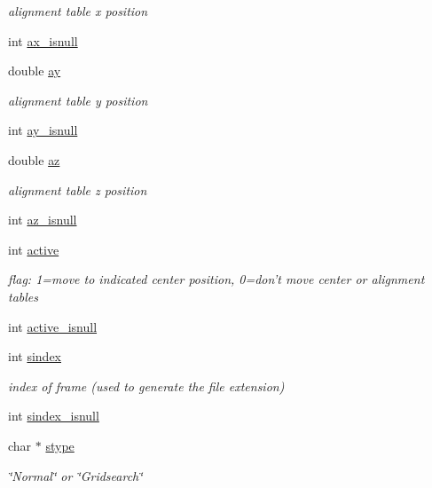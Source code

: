 \begin{DoxyCompactItemize}
\begin{DoxyCompactList}\small\item\em alignment table x position \end{DoxyCompactList}\item 
int \hyperlink{structlspg__nextshot__struct_aae46c7911b2b218497ad4a68f3dbb7d9}{ax\-\_\-isnull}
\item 
double \hyperlink{structlspg__nextshot__struct_a9e20b9a0aeb41f7f7d653a1c60335bf1}{ay}
\begin{DoxyCompactList}\small\item\em alignment table y position \end{DoxyCompactList}\item 
int \hyperlink{structlspg__nextshot__struct_a9da91abc8090532ed98ccd47a3bab775}{ay\-\_\-isnull}
\item 
double \hyperlink{structlspg__nextshot__struct_a66e678866ce79f6398b66d033ae45a17}{az}
\begin{DoxyCompactList}\small\item\em alignment table z position \end{DoxyCompactList}\item 
int \hyperlink{structlspg__nextshot__struct_aaebd6d432810313294b5fed5f4445cb1}{az\-\_\-isnull}
\item 
int \hyperlink{structlspg__nextshot__struct_a1a94eefbad713976a3d9213695a6ca28}{active}
\begin{DoxyCompactList}\small\item\em flag\-: 1=move to indicated center position, 0=don't move center or alignment tables \end{DoxyCompactList}\item 
int \hyperlink{structlspg__nextshot__struct_a9f777671ec617a0f533b3c51f28babb3}{active\-\_\-isnull}
\item 
int \hyperlink{structlspg__nextshot__struct_a5d096f2c2bf9be29c44129b54eaf01da}{sindex}
\begin{DoxyCompactList}\small\item\em index of frame (used to generate the file extension) \end{DoxyCompactList}\item 
int \hyperlink{structlspg__nextshot__struct_a7ca4fbc86974d1b75a681ba5ecaaf5af}{sindex\-\_\-isnull}
\item 
char $\ast$ \hyperlink{structlspg__nextshot__struct_ab5a70b189c2fe516ca0c84bd06f3e564}{stype}
\begin{DoxyCompactList}\small\item\em \char`\"{}\-Normal\char`\"{} or \char`\"{}\-Gridsearch\char`\"{} \end{DoxyCompactList}\item 

\end{DoxyCompactItemize}
